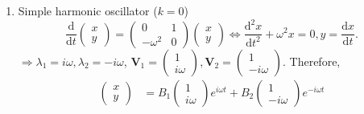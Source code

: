 \documentclass[12pt]{report}
\theoremstyle{definition}
\begin{document}
\begin{ex}
\begin{enumerate}[label = (\roman*)]
\begin{enumerate}[label = (\alph*)]
                    \item Simple harmonic oscillator ($k = 0$)\[
                        \frac{\mathrm{d}}{\mathrm{d}t} \begin{pmatrix}
                                x \\
                                y
                        \end{pmatrix} = \begin{pmatrix}
                        0 & 1 \\
                        -\omega^{2} & 0
                        \end{pmatrix} \begin{pmatrix}
                                x \\
                                y
                        \end{pmatrix} \iff \frac{\mathrm{d}^{2}x}{\mathrm{d}t^{2}} 
                        + \omega^{2}x = 0, y = \frac{\mathrm{d}x}{\mathrm{d}t}.
                    \]
                    $\Rightarrow{}\lambda_1 = i\omega, \lambda_2 = -i\omega$,
                    $\pmb{V}_1 = \begin{pmatrix}
                            1 \\
                            i\omega
                        \end{pmatrix} , \pmb{V}_2 = \begin{pmatrix}
                                1 \\
                                -i\omega
                        \end{pmatrix}$.
                        Therefore,\[
                            \begin{align*}
                            \begin{pmatrix}
                                    x \\
                                    y
                            \end{pmatrix} 
                            & = B_1\begin{pmatrix}
                                    1 \\
                                    i\omega
                            \end{pmatrix} e^{i\omega t} + B_{2} \begin{pmatrix}
                                    1 \\
                                    -i\omega
                            \end{pmatrix} e^{-i\omega t} \\

\end{align*}\]
\end{enumerate}
\end{enumerate}
\end{ex}
\end{document}
